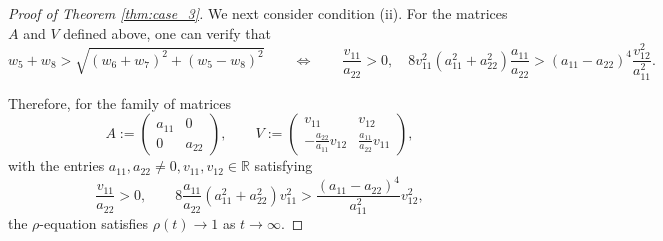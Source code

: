 \documentclass[10pt]{article}
\theoremstyle{definition}
\theoremstyle{definition}
\numberwithin{equation}{section}
\newcommand{\R}{\mathbb{R}}
\begin{document}
\begin{proof}[Proof of Theorem \ref{thm:case_3}]
We next consider condition (ii).
For the matrices $A$ and $V$ defined above, one can verify that
\begin{equation*}
    w_5 + w_8 > \sqrt{(w_6 + w_7)^2 + (w_5 - w_8)^2} \qquad
    \Longleftrightarrow \qquad \frac{v_{11}}{a_{22}} > 0, \quad  8 v_{11}^2  (a_{11}^2 + a_{22}^2) \frac{a_{11}}{a_{22}} > (a_{11} - a_{22})^4 \frac{v_{12}^2}{a_{11}^2} .
\end{equation*}

Therefore, for the family of matrices 
\begin{equation}\label{eq:case3_matrices_A_V_in_proof}
A := \left(\begin{array}{ll}
    a_{11} & 0 \\
    0 & a_{22}
\end{array} \right), \qquad  V := \left( \begin{array}{cc}
    v_{11} & v_{12}  \\[4pt]
    -\frac{a_{22}}{a_{11}} v_{12} & \frac{a_{11}}{a_{22}} v_{11} 
\end{array} \right),
\end{equation}
with the entries $a_{11}, a_{22} \neq 0, v_{11}, v_{12} \in \R$ satisfying
\begin{equation}\label{eq:suffi_cond_rho_converge_A_V}
\frac{v_{11}}{a_{22}} > 0, \qquad 8 \frac{a_{11}}{a_{22}} (a_{11}^2 + a_{22}^2) v_{11}^2  >  \frac{(a_{11} - a_{22})^4}{a_{11}^2} v_{12}^2,
\end{equation}
the $\rho$-equation satisfies $\rho(t) \rightarrow 1$ as $t \rightarrow \infty$.


\end{proof}
\end{document}
